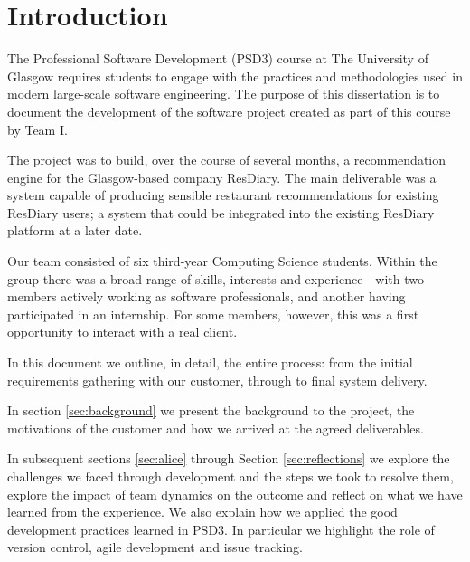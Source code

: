 \documentclass{l3proj}
\begin{document}

\section{Introduction}
\label{sec:intro}

The Professional Software Development (PSD3) course at The University of Glasgow requires students to engage with the practices and methodologies used in modern large-scale software engineering. The purpose of this dissertation is to document the development of the software project created as part of this course by Team I. 

The project was to build, over the course of several months, a recommendation engine for the Glasgow-based company ResDiary.
The main deliverable was a system capable of producing sensible restaurant recommendations for existing ResDiary users; a system that could be integrated into the existing ResDiary platform at a later date. 

Our team consisted of six third-year Computing Science students. Within the group there was a broad range of skills, interests and experience - with two members actively working as software professionals, and another having participated in an internship. For some members, however, this was a first opportunity to interact with a real client. 

In this document we outline, in detail, the entire process: from the initial requirements gathering with our customer, through to final system delivery. 

In section \ref{sec:background} we present the background to the project, the motivations of the customer and how we arrived at the agreed deliverables.


In subsequent sections \ref{sec:alice} through Section \ref{sec:reflections} we explore the challenges we faced through development and the steps we took to resolve them, explore the impact of team dynamics on the outcome and reflect on what we have learned from the experience. We also explain how we applied the good development practices learned in PSD3. In particular we highlight the role of version control, agile development and issue tracking.
\end{document}
